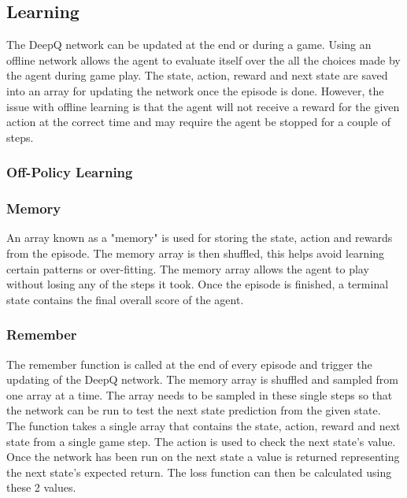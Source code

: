 \subsection{Learning}

The DeepQ network can be updated at the end or during a game. Using an offline network allows the agent to evaluate itself over the all the choices made by the agent during game play. The state, action, reward and next state are saved into an array for updating the network once the episode is done. However, the issue with offline learning is that the agent will not receive a reward for the given action at the correct time and may require the agent be stopped for a couple of steps. 

\subsubsection{Off-Policy Learning}



\subsubsection{Memory}

An array known as a "memory" is used for storing the state, action and rewards from the episode. The memory array is then shuffled, this helps avoid learning certain patterns or over-fitting. The memory array allows the agent to play without losing any of the steps it took. Once the episode is finished, a terminal state contains the final overall score of the agent. 

\subsubsection{Remember}

The remember function is called at the end of every episode and trigger the updating of the DeepQ network. The memory array is shuffled and sampled from one array at a time. The array needs to be sampled in these single steps so that the network can be run to test the next state prediction from the given state. The function takes a single array that contains the state, action, reward and next state from a single game step. The action is used to check the next state's value. Once the network has been run on the next state a value is returned representing the next state's expected return. The loss function can then be calculated using these 2 values.